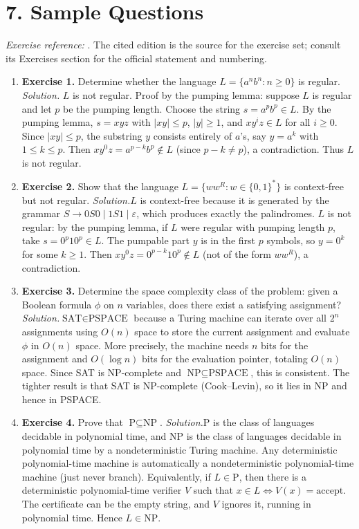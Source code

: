 \section*{7. Sample Questions}
\emph{Exercise reference:} \cite{computation_ref1}. The cited edition is the source for the exercise set; consult its Exercises section for the official statement and numbering.
\begin{enumerate}[leftmargin=*,itemsep=0.9em]
\item \textbf{Exercise 1.} Determine whether the language $L = \{a^n b^n : n \geq 0\}$ is regular. \emph{Solution.} $L$ is not regular. Proof by the pumping lemma: suppose $L$ is regular and let $p$ be the pumping length. Choose the string $s = a^p b^p \in L$. By the pumping lemma, $s = xyz$ with $|xy| \leq p$, $|y| \geq 1$, and $xy^i z \in L$ for all $i \geq 0$. Since $|xy| \leq p$, the substring $y$ consists entirely of $a$'s, say $y = a^k$ with $1 \leq k \leq p$. Then $xy^0 z = a^{p-k}b^p \notin L$ (since $p - k \neq p$), a contradiction. Thus $L$ is not regular.

\item \textbf{Exercise 2.} Show that the language $L = \{ww^R : w \in \{0,1\}^*\}$ is context-free but not regular. \emph{Solution.}$L$ is context-free because it is generated by the grammar $S \to 0S0 \mid 1S1 \mid \varepsilon$, which produces exactly the palindromes. $L$ is not regular: by the pumping lemma, if $L$ were regular with pumping length $p$, take $s = 0^p 1 0^p \in L$. The pumpable part $y$ is in the first $p$ symbols, so $y = 0^k$ for some $k \geq 1$. Then $xy^0z = 0^{p-k}1 0^p \notin L$ (not of the form $ww^R$), a contradiction.

\item \textbf{Exercise 3.} Determine the space complexity class of the problem: given a Boolean formula $\phi$ on $n$ variables, does there exist a satisfying assignment? \emph{Solution.}$\text{SAT} \in \text{PSPACE}$ because a Turing machine can iterate over all $2^n$ assignments using $O(n)$ space to store the current assignment and evaluate $\phi$ in $O(n)$ space. More precisely, the machine needs $n$ bits for the assignment and $O(\log n)$ bits for the evaluation pointer, totaling $O(n)$ space. Since SAT is NP-complete and $\text{NP} \subseteq \text{PSPACE}$, this is consistent. The tighter result is that SAT is NP-complete (Cook--Levin), so it lies in NP and hence in PSPACE.

\item \textbf{Exercise 4.} Prove that $\text{P} \subseteq \text{NP}$. \emph{Solution.}$\text{P}$ is the class of languages decidable in polynomial time, and $\text{NP}$ is the class of languages decidable in polynomial time by a nondeterministic Turing machine. Any deterministic polynomial-time machine is automatically a nondeterministic polynomial-time machine (just never branch). Equivalently, if $L \in \text{P}$, then there is a deterministic polynomial-time verifier $V$ such that $x \in L \iff V(x) = \text{accept}$. The certificate can be the empty string, and $V$ ignores it, running in polynomial time. Hence $L \in \text{NP}$.


\end{enumerate}
